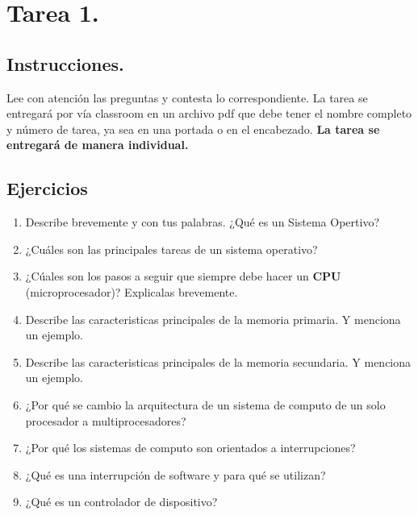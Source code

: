 \documentclass[12pt]{article}
\begin{document}

{\color{blue} \section*{Tarea 1.}}

{\color{blue} \subsection*{Instrucciones.}}
\vspace{0.5em} 

Lee con atención las preguntas y contesta lo correspondiente. La tarea se entregará por vía classroom
en un archivo pdf que debe tener el nombre completo y número de tarea, ya sea en una portada o en el encabezado.
\textbf{La tarea se entregará de manera individual.}\\

{\color{blue} \subsection*{Ejercicios}}
\vspace{0.5em}

\begin{enumerate}
    \item Describe brevemente y con tus palabras. ¿Qué es un Sistema Opertivo?
    \item ¿Cuáles son las principales tareas de un sistema operativo?
    \item ¿Cúales son los pasos a seguir que siempre debe hacer un \textbf{CPU} (microprocesador)? Explicalas brevemente.
    \item Describe las caracteristicas principales de la memoria primaria. Y menciona un ejemplo.
    \item Describe las caracteristicas principales de la memoria secundaria. Y menciona un ejemplo.
    \item ¿Por qué se cambio la arquitectura de un sistema de computo de un solo procesador a multiprocesadores?
    \item ¿Por qué los sistemas de computo son orientados a interrupciones?
    \item ¿Qué es una interrupción de software y para qué se utilizan?
    \item ¿Qué es un controlador de dispositivo? 
\end{enumerate}
\end{document}
